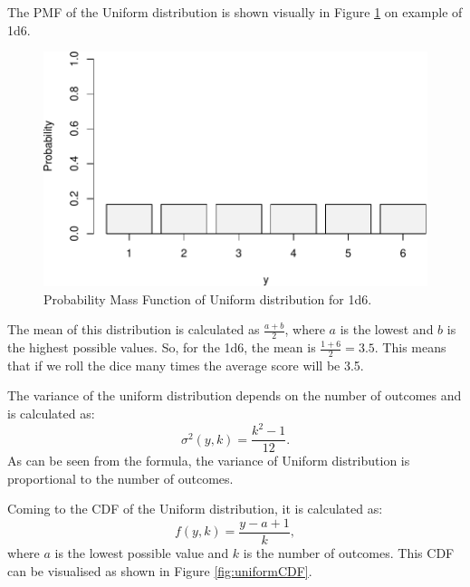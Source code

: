 \documentclass[
]{book}
\theoremstyle{definition}
\theoremstyle{definition}
\theoremstyle{definition}
\theoremstyle{definition}
\theoremstyle{remark}
\begin{document}
The PMF of the Uniform distribution is shown visually in Figure \ref{fig:uniformPMF} on example of 1d6.

\begin{figure}
\centering
\includegraphics{Svetunkov---Statistics-for-Business-Analytics_files/figure-latex/uniformPMF-1.pdf}
\caption{\label{fig:uniformPMF}Probability Mass Function of Uniform distribution for 1d6.}
\end{figure}

The mean of this distribution is calculated as \(\frac{a+b}{2}\), where \(a\) is the lowest and \(b\) is the highest possible values. So, for the 1d6, the mean is \(\frac{1+6}{2}=3.5\). This means that if we roll the dice many times the average score will be 3.5.

The variance of the uniform distribution depends on the number of outcomes and is calculated as:
\begin{equation}
    \sigma^2(y, k) = \frac{k^2-1}{12} .
    \label{eq:BernoulliVariance}
\end{equation}
As can be seen from the formula, the variance of Uniform distribution is proportional to the number of outcomes.

Coming to the CDF of the Uniform distribution, it is calculated as:
\begin{equation}
    f(y, k) = \frac{y-a+1}{k},
    \label{eq:BernoulliCDF}
\end{equation}
where \(a\) is the lowest possible value and \(k\) is the number of outcomes. This CDF can be visualised as shown in Figure \ref{fig:uniformCDF}.
\end{document}

